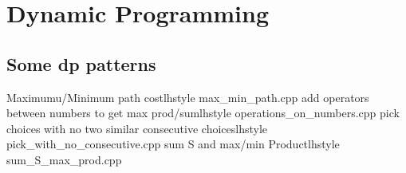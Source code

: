\section{Dynamic Programming}
  \subsection{Some dp patterns}
     {Maximumu/Minimum path cost}{lhstyle} {max_min_path.cpp}
     {add operators between numbers to get max prod/sum}{lhstyle} {operations_on_numbers.cpp}
     {pick choices with no two similar consecutive choices}{lhstyle} {pick_with_no_consecutive.cpp}
     {sum S and max/min Product}{lhstyle} {sum_S_max_prod.cpp}
